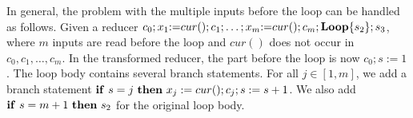 \documentclass{llncs}
\newcommand{\cur}{cur()}
\newcommand{\IF}[2]{
	\ifmmode
	\mathbf{if}\ #1 \ \mathbf{then}\ #2
	\else
	\textbf{if}\ #1 \ \textbf{then}\ #2
	\fi}
\newcommand{\rloop}{
	\ifmmode
	\mathbf{Loop}
	\else
	\textbf{Loop}
	\fi}
\begin{document}
%			

In general, the problem with the multiple inputs before the loop can be handled as follows. Given a reducer $c_0;x_{1}{:=} \cur;c_1; \ldots; x_{m}{:=}\cur;c_m;\rloop\{s_2\};s_3$, where $m$ inputs are read before the loop and $\cur$ does
not occur in $c_0,c_1,\ldots, c_m$. 
In the transformed reducer, the part before the loop is now $c_0;s:=1$. The loop body contains several branch statements. 
For all $j \in [1,m]$, we add a branch statement $\IF{s=j}{x_{j}:=\cur; c_j; s:=s+1}$. 
We also add $\IF{s=m+1}{s_2}$ for the original loop body.


\end{document}
